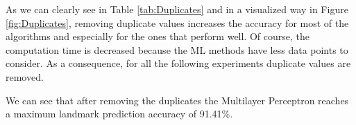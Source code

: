 As we can clearly see in Table \ref{tab:Duplicates} and in a visualized way in Figure \ref{fig:Duplicates}, removing duplicate values increases the accuracy for most of the algorithms and especially for the ones that perform well. Of course, the computation time is decreased because the ML methods have less data points to consider. As a consequence, for all the following experiments duplicate values are removed.

We can see that after removing the duplicates the Multilayer Perceptron reaches a maximum landmark prediction accuracy of 91.41\%.



%
%
%
